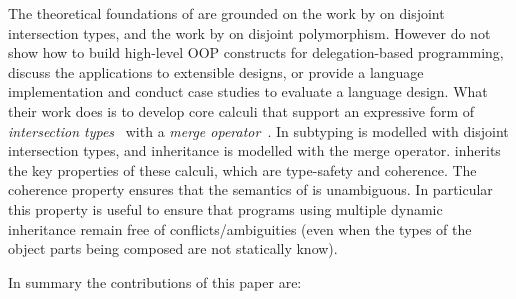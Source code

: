 The theoretical foundations of \name are grounded on the work by
\citet{oliveira2016disjoint} on disjoint intersection types, and the
work by \citet{alpuimdisjoint} on disjoint polymorphism. However
\citet{oliveira2016disjoint,alpuimdisjoint} do not show how to build
high-level OOP constructs for delegation-based programming, 
discuss the applications to extensible designs, or provide a language implementation and
conduct case studies to evaluate a language design. What their
work does is to develop core calculi that support an expressive form of
\emph{intersection types}~\cite{} with a \emph{merge operator}~\cite{}. In
\name subtyping is modelled with disjoint intersection types, and
inheritance is modelled with the merge operator. \name inherits the key properties of
these calculi, which are type-safety and coherence. The coherence property
ensures that the semantics of \name is unambiguous. In particular this
property is useful to ensure that programs using multiple dynamic
inheritance remain free of conflicts/ambiguities (even when the types
of the object parts being composed are not statically know). 
  
\begin{comment}
The
novelty of the work in this paper is a three-fold. Firstly we show how
to develop and implement a statically typed, delegation-based OOP
source language on top of core language constructs provided by
disjoint intersection types. Secondly we illustrate the applications
of those high-level constructs to solve issues that show up in
extensibility designs. Finally, we provide a case study on
modularization of language components.
\end{comment}

In summary the contributions of this paper are:

